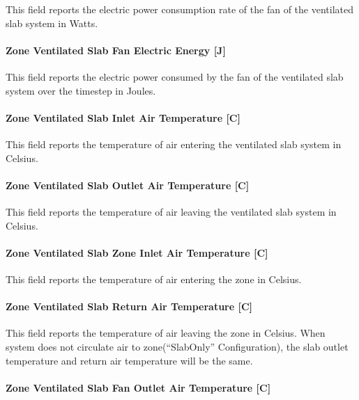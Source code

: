 This field reports the electric power consumption rate of the fan of the ventilated slab system in Watts.

\paragraph{Zone Ventilated Slab Fan Electric Energy {[}J{]}}\label{zone-ventilated-slab-fan-electric-energy-j}

This field reports the electric power consumed by the fan of the ventilated slab system over the timestep in Joules.

\paragraph{Zone Ventilated Slab Inlet Air Temperature {[}C{]}}\label{zone-ventilated-slab-inlet-air-temperature-c}

This field reports the temperature of air entering the ventilated slab system in Celsius.

\paragraph{Zone Ventilated Slab Outlet Air Temperature {[}C{]}}\label{zone-ventilated-slab-outlet-air-temperature-c}

This field reports the temperature of air leaving the ventilated slab system in Celsius.

\paragraph{Zone Ventilated Slab Zone Inlet Air Temperature {[}C{]}}\label{zone-ventilated-slab-zone-inlet-air-temperature-c}

This field reports the temperature of air entering the zone in Celsius.

\paragraph{Zone Ventilated Slab Return Air Temperature {[}C{]}}\label{zone-ventilated-slab-return-air-temperature-c}

This field reports the temperature of air leaving the zone in Celsius. When system does not circulate air to zone(``SlabOnly'' Configuration), the slab outlet temperature and return air temperature will be the same.

\paragraph{Zone Ventilated Slab Fan Outlet Air Temperature {[}C{]}}\label{zone-ventilated-slab-fan-outlet-air-temperature-c}

